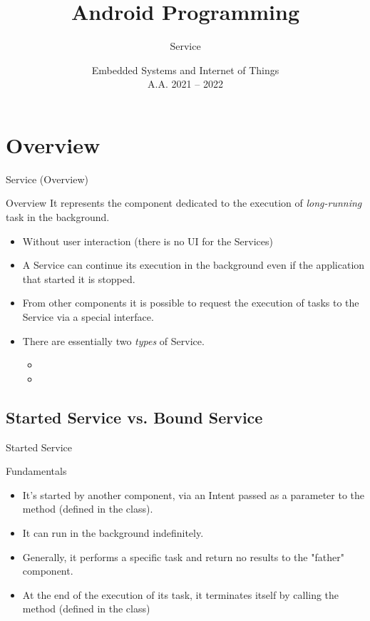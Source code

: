 \documentclass{beamer}
\title[Android -- 1D -- Service]{Android Programming}
\subtitle{Service}
\date[ver. 1.0 (20220505)]{Embedded Systems and Internet of Things\\A.A. 2021 -- 2022}
\begin{document}
  \begin{frame}
    \titlepage
  \end{frame}

  

\section{Overview}

  \begin{frame}{Service (Overview)}
    \begin{block}{Overview}
      It represents the component dedicated to the execution of
      \textit{long-running} task in the background.
      \begin{itemize}\itemsep10pt
        \item Without user interaction (there is no UI for the Services) 
      \end{itemize}
      \begin{itemize}\itemsep10pt
        \item A Service can continue its execution in the background even if the
        application that started it is stopped.
        \item From other components it is possible to request the execution of
        tasks to the Service via a special interface.
        \item There are essentially two \textit{types} of Service.
        \begin{itemize}
          \item {}
          \item {}
        \end{itemize}
      \end{itemize}
    \end{block}
  \end{frame}

\subsection{Started Service vs. Bound Service}

  \begin{frame}{Started Service}
    \begin{block}{Fundamentals}
      \begin{itemize}\itemsep10pt
        \item It's started by another component, via an Intent passed as a
        parameter to the  method (defined in the
         class).
        \item It can run in the background indefinitely.
        \item Generally, it performs a specific task and return no results to the
        "father" component.
        \item At the end of the execution of its task, it terminates itself by
        calling the  method (defined in the
         class) 
      \end{itemize}
    \end{block}
  \end{frame}
\end{document}
